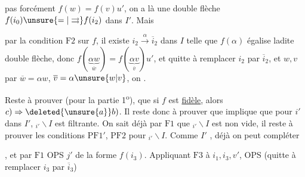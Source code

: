 
 pas forcément $f(w)=f(v)u'$, on a là une double flèche  $f(i_0)\unsure{=|\rightrightarrows}f(i_2)$ dans $I'$. Mais


par la condition $\mathrm{F}2$ sur $f$, il existe $i_2\xrightarrow{\alpha}\overline{i}_2$ dans $I$ telle que $f(\alpha)$ égalise ladite double flèche, donc $f(\underbrace{\alpha w}_{\overline{w}})=f(\underbrace{\alpha v}_{\overline{v}})u'$, et quitte à remplacer $i_2$ par $\overline{i}_2$, et  $w,v$ par $\overline{w}=\alpha w$, $\overline{v}=\alpha\unsure{w|v}$, on .

Reste à prouver (pour la partie 1\textsuperscript{o}), que si $f$ est \uline{fidèle}, alors $c)\Rightarrow\deleted{\unsure{a}}b)$. Il reste donc à prouver que  implique que  pour $i'$ dans $I'$, $ {}_{i'}\backslash I$ est filtrante. On sait déjà par $\mathrm{F}1$ que $ {}_{i'}\backslash I$ est non vide, il reste à prouver les conditions $\mathrm{PF}1'$, $\mathrm{PF}2$ pour $ {}_{i'}\backslash I$. Comme $I'$ , déjà on peut compléter



, et  par $\mathrm{F}1$ OPS $j'$ de la forme $f(i_3)$. Appliquant $\mathrm{F}3$ à $i_1,i_3,v'$, OPS (quitte à remplacer $i_3$ par $\overline{i}_3$)

